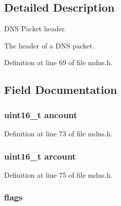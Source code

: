 \subsection{Detailed Description}
D\-N\-S Packet header. 

The header of a D\-N\-S packet. 

Definition at line 69 of file mdns.\-h.



\subsection{Field Documentation}
\hypertarget{structdns__packet__header__t_a2a5577b198ba758438292038bbab5437}{
\subsubsection[{ancount}]{\setlength{\rightskip}{0pt plus 5cm}uint16\-\_\-t ancount}}\label{structdns__packet__header__t_a2a5577b198ba758438292038bbab5437}


Definition at line 73 of file mdns.\-h.

\hypertarget{structdns__packet__header__t_a6eedffaf6f8d915f67e6f6bb77094562}{
\subsubsection[{arcount}]{\setlength{\rightskip}{0pt plus 5cm}uint16\-\_\-t arcount}}\label{structdns__packet__header__t_a6eedffaf6f8d915f67e6f6bb77094562}


Definition at line 75 of file mdns.\-h.

\hypertarget{structdns__packet__header__t_a17537773eff778e034c52ba8bc8c2691}{
\subsubsection[{flags}]{ flags}}\label{structdns__packet__header__t_a17537773eff778e034c52ba8bc8c2691}


